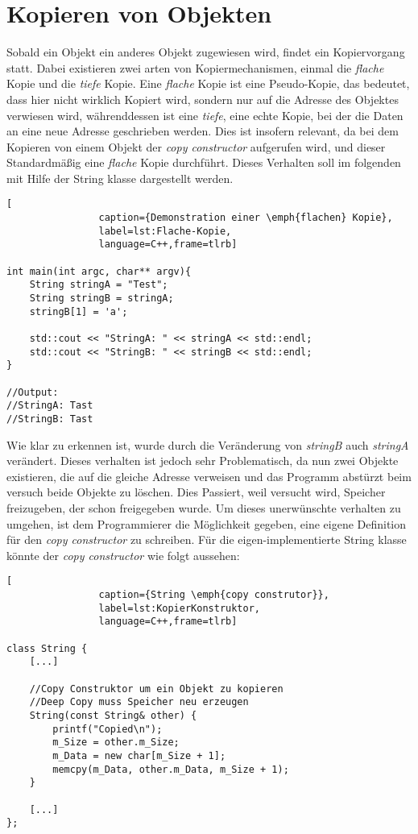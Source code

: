 \section{Kopieren von Objekten}
Sobald ein Objekt ein anderes Objekt zugewiesen wird, findet ein Kopiervorgang statt. Dabei existieren zwei arten von Kopiermechanismen, einmal die \emph{flache} Kopie und die \emph{tiefe} Kopie. Eine \emph{flache} Kopie ist eine Pseudo-Kopie, das bedeutet, dass hier nicht wirklich Kopiert wird, sondern nur auf die Adresse des Objektes verwiesen wird, währenddessen ist eine \emph{tiefe}, eine echte Kopie, bei der die Daten an eine neue Adresse geschrieben werden. Dies ist insofern relevant, da bei dem Kopieren von einem Objekt der \emph{copy constructor} aufgerufen wird, und dieser Standardmäßig eine \emph{flache} Kopie durchführt. Dieses Verhalten soll im folgenden mit Hilfe der String klasse dargestellt werden.

\begin{lstlisting}[
  				caption={Demonstration einer \emph{flachen} Kopie},
  				label=lst:Flache-Kopie,
  				language=C++,frame=tlrb]
  				
int main(int argc, char** argv){
	String stringA = "Test";
	String stringB = stringA;
	stringB[1] = 'a';

	std::cout << "StringA: " << stringA << std::endl;
	std::cout << "StringB: " << stringB << std::endl;
}

//Output:
//StringA: Tast
//StringB: Tast		
			\end{lstlisting}
			
Wie klar zu erkennen ist, wurde durch die Veränderung von \emph{stringB} auch \emph{stringA} verändert. Dieses verhalten ist jedoch sehr Problematisch, da nun zwei Objekte existieren, die auf die gleiche Adresse verweisen und das Programm abstürzt beim versuch beide Objekte zu löschen. Dies Passiert, weil versucht wird, Speicher freizugeben, der schon freigegeben wurde. Um dieses unerwünschte verhalten zu umgehen, ist dem Programmierer die Möglichkeit gegeben, eine eigene Definition für den \emph{copy constructor} zu schreiben. Für die eigen-implementierte String klasse könnte der \emph{copy constructor} wie folgt aussehen:

\begin{lstlisting}[
  				caption={String \emph{copy construtor}},
  				label=lst:KopierKonstruktor,
  				language=C++,frame=tlrb]
  				
class String {
	[...]
	
	//Copy Construktor um ein Objekt zu kopieren
    //Deep Copy muss Speicher neu erzeugen
    String(const String& other) {
        printf("Copied\n");
        m_Size = other.m_Size;
        m_Data = new char[m_Size + 1];
        memcpy(m_Data, other.m_Data, m_Size + 1);
    }
    
	[...]
};
			\end{lstlisting}
			
